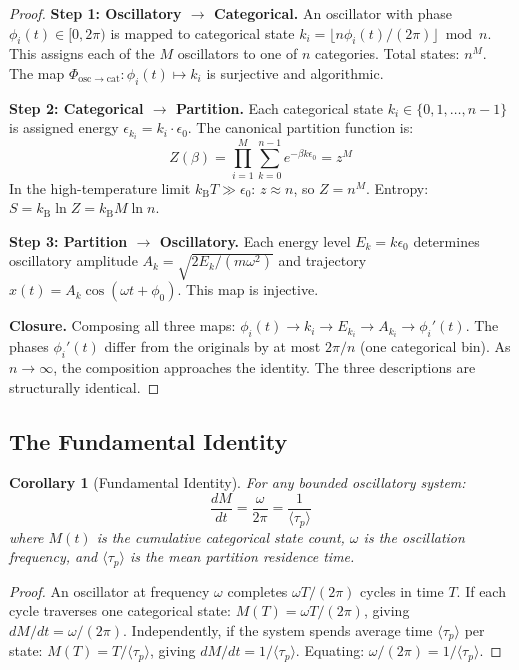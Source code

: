 \documentclass[11pt,twocolumn,a4paper]{article}
\newtheorem{corollary}[theorem]{Corollary}
\theoremstyle{definition}
\theoremstyle{remark}
\newcommand{\kB}{k_{\mathrm{B}}}
\newcommand{\taup}{\tau_p}
\begin{document}
\begin{proof}
\textbf{Step 1: Oscillatory $\to$ Categorical.} An oscillator with phase $\phi_i(t) \in [0, 2\pi)$ is mapped to categorical state $k_i = \lfloor n \phi_i(t) / (2\pi) \rfloor \bmod n$. This assigns each of the $M$ oscillators to one of $n$ categories. Total states: $n^M$. The map $\Phi_{\mathrm{osc} \to \mathrm{cat}}: \phi_i(t) \mapsto k_i$ is surjective and algorithmic.

\textbf{Step 2: Categorical $\to$ Partition.} Each categorical state $k_i \in \{0, 1, \ldots, n-1\}$ is assigned energy $\epsilon_{k_i} = k_i \cdot \epsilon_0$. The canonical partition function is:
\begin{equation}
Z(\beta) = \prod_{i=1}^{M} \sum_{k=0}^{n-1} e^{-\beta k \epsilon_0} = z^M
\end{equation}
In the high-temperature limit $\kB T \gg \epsilon_0$: $z \approx n$, so $Z = n^M$. Entropy: $S = \kB \ln Z = \kB M \ln n$.

\textbf{Step 3: Partition $\to$ Oscillatory.} Each energy level $E_k = k \epsilon_0$ determines oscillatory amplitude $A_k = \sqrt{2E_k/(m\omega^2)}$ and trajectory $x(t) = A_k \cos(\omega t + \phi_0)$. This map is injective.

\textbf{Closure.} Composing all three maps: $\phi_i(t) \to k_i \to E_{k_i} \to A_{k_i} \to \phi_i'(t)$. The phases $\phi_i'(t)$ differ from the originals by at most $2\pi/n$ (one categorical bin). As $n \to \infty$, the composition approaches the identity. The three descriptions are structurally identical.
\end{proof}

\subsection{The Fundamental Identity}

\begin{corollary}[Fundamental Identity]
\label{cor:fundamental}
For any bounded oscillatory system:
\begin{equation}
\boxed{\frac{dM}{dt} = \frac{\omega}{2\pi} = \frac{1}{\langle \taup \rangle}}
\label{eq:fundamental_identity}
\end{equation}
where $M(t)$ is the cumulative categorical state count, $\omega$ is the oscillation frequency, and $\langle \taup \rangle$ is the mean partition residence time.
\end{corollary}

\begin{proof}
An oscillator at frequency $\omega$ completes $\omega T/(2\pi)$ cycles in time $T$. If each cycle traverses one categorical state: $M(T) = \omega T/(2\pi)$, giving $dM/dt = \omega/(2\pi)$. Independently, if the system spends average time $\langle \taup \rangle$ per state: $M(T) = T/\langle \taup \rangle$, giving $dM/dt = 1/\langle \taup \rangle$. Equating: $\omega/(2\pi) = 1/\langle \taup \rangle$.
\end{proof}
\end{document}
